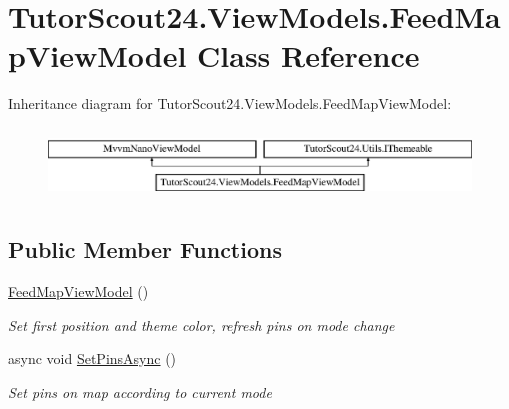 \hypertarget{class_tutor_scout24_1_1_view_models_1_1_feed_map_view_model}{}\section{Tutor\+Scout24.\+View\+Models.\+Feed\+Map\+View\+Model Class Reference}
\label{class_tutor_scout24_1_1_view_models_1_1_feed_map_view_model}
Inheritance diagram for Tutor\+Scout24.\+View\+Models.\+Feed\+Map\+View\+Model\+:\begin{figure}[H]
\begin{center}
\leavevmode
\includegraphics[height=1.937716cm]{class_tutor_scout24_1_1_view_models_1_1_feed_map_view_model}
\end{center}
\end{figure}
\subsection*{Public Member Functions}
\begin{DoxyCompactItemize}
\item 
\mbox{\hyperlink{class_tutor_scout24_1_1_view_models_1_1_feed_map_view_model_a10e3a2e4dc8d620edc5e2c102b77ae6e}{Feed\+Map\+View\+Model}} ()
\begin{DoxyCompactList}\small\item\em Set first position and theme color, refresh pins on mode change \end{DoxyCompactList}\item 
async void \mbox{\hyperlink{class_tutor_scout24_1_1_view_models_1_1_feed_map_view_model_a185abcf0335630b2ce5011d70464df58}{Set\+Pins\+Async}} ()
\begin{DoxyCompactList}\small\item\em Set pins on map according to current mode \end{DoxyCompactList}\end{DoxyCompactItemize}

